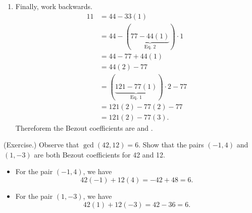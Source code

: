 \documentclass[letterpaper]{article}
\begin{document}
\begin{mdframed}
\begin{itemize}
\begin{mdframed}
\begin{enumerate}
                \item Finally, work backwards. 
                \begin{equation*}
                    \begin{aligned}
                        11 &= 44 - 33(1) \\ 
                            &= 44 - (\underbrace{77 - 44(1)}_{\text{Eq. 2}}) \cdot 1 \\
                            &= 44 - 77 + 44(1) \\ 
                            &= 44(2) - 77 \\ 
                            &= (\underbrace{121 - 77(1)}_{\text{Eq. 1}}) \cdot 2 - 77 \\ 
                            &= 121(2) - 77(2) - 77 \\ 
                            &= 121(2) - 77(3).
                    \end{aligned}
                \end{equation*}
                Thereforem the Bezout coefficients are  and .
            \end{enumerate}
        \end{mdframed}
    \end{itemize}
\end{mdframed}

\begin{mdframed}
    (Exercise.) Observe that $\gcd(42, 12) = 6$. Show that the pairs $(-1, 4)$ and $(1, -3)$ are both Bezout coefficients for 42 and 12. 

    \begin{mdframed}
        \begin{itemize}
            \item For the pair $(-1, 4)$, we have 
            \[42(-1) + 12(4) = -42 + 48 = 6.\]

            \item For the pair $(1, -3)$, we have 
            \[42(1) + 12(-3) = 42 - 36 = 6.\]
        \end{itemize}
    \end{mdframed}
\end{mdframed}
\end{document}
